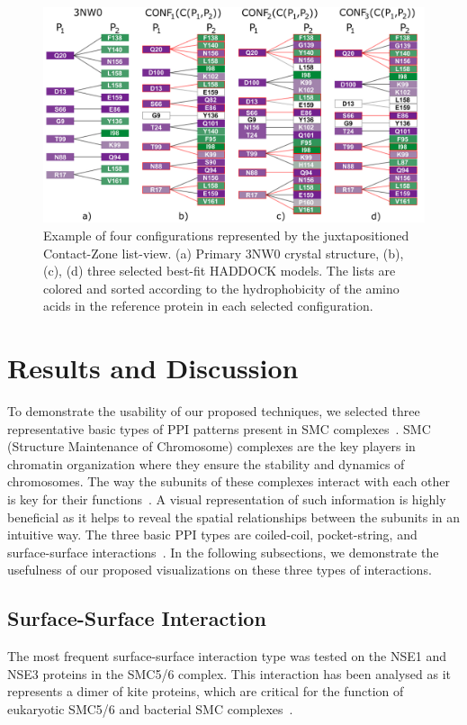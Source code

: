 \documentclass[twocolumn]{bmcart}%
\def\CoZoListView {Contact-Zone list-view\xspace}
\begin{document}
\begin{figure}[tb]
    \centering
    \includegraphics[width=1.87\columnwidth]{images/figure9.pdf}
    \vspace{-5pt}
    \caption{ Example of four configurations represented by the juxtapositioned \CoZoListView. (a) Primary 3NW0 crystal structure, (b), (c), (d) three selected best-fit HADDOCK models. The lists are colored and sorted according to the hydrophobicity of the amino acids in the reference protein in each selected configuration.}
  \label{fig:case3}
\end{figure}

\section*{Results and Discussion}
To demonstrate the usability of our proposed techniques, we selected three representative basic types of PPI patterns present in SMC complexes~\cite{Palecek2015}. 
SMC (Structure Maintenance of Chromosome) complexes are the key players in chromatin organization where they ensure the stability and dynamics of chromosomes. The way the subunits of these complexes interact with each other is key for their functions~\cite{Gligoris}.
A visual representation of such information is highly beneficial as it helps to reveal the spatial relationships between the subunits in an intuitive way.
The three basic PPI types are coiled-coil, pocket-string, and surface-surface interactions~\cite{alberts02molecular}.
In the following subsections, we demonstrate the usefulness of our proposed visualizations on these three types of interactions.

\subsection*{Surface-Surface Interaction}
The most frequent surface-surface interaction type was tested on the NSE1 and NSE3 proteins in the SMC5/6 complex. 
This interaction has been analysed as it represents a dimer of kite proteins, which are critical for the function of eukaryotic SMC5/6 and bacterial SMC complexes~\cite{Zabrady2016,Palecek2015,Doyle2010}. 
\end{document}
